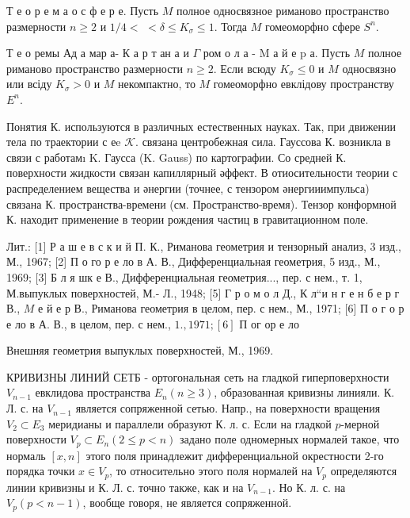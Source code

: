 \documentclass[10pt]{article}
\begin{document}
Т е о р е м а о с ф е р е. Пусть $M$ полное односвязное риманово пространство размерности $n \geqslant 2$ и $1 / 4<$ $<\delta \leqslant K_{\sigma} \leqslant 1$. Тогда $M$ гомеоморфно сфере $S^{n}$.



Т е о ремы Ад а мар а- К а р т ан а и $\Gamma$ ром о л а - $\mathrm{M}$ а й е $\mathrm{p}$ а. Пусть $M$ полное риманово пространство размерности $n \geqslant 2$. Если всюду $K_{\sigma} \leqslant 0$ и $M$ односвязно или всіду $K_{\sigma}>0$ и $M$ некомпактно, то $M$ гомеоморфно евклідову пространству $E^{n}$.



Понятия К. используются в различных естественных науках. Так, при движении тела по траектории с еe $\mathcal{K}$. связана центробежная сила. Гауссова $К$. возникла в связи с работамı K. Гаусса (K. Gauss) по картографии. Со средней К. поверхности жидкости связан капиллярный әффект. В отиосительности теории с распределением вещества и әнергии (точнее, с тензором әнергииимпульса) связана К. пространства-времени (см. Пространство-время). Тензор конформной К. находит применение в теории рождения частиц в гравитационном поле.



Лит.: [1] Р а ш е в с к и й П. К., Риманова геометрия и тензорный анализ, 3 изд., М., 1967; [2] П о го р е ло в А. В., Дифференциальная геометрия, 5 изд., М., 1969; [3] Б л я шк е В., Дифференциальная геометрия..., пер. с нем., т. 1, М.выпуклых поверхностей, М.- Л., 1948; [5] Г р о м о л Д., К л“и н г е н б е р г В., $M$ е й е р В., Риманова геометрия в целом, пер. с нем., М., 1971; [6] П о г о р е ло в А. В., в целом, пер. с нем., $1 ., 1971 ;[6]$ П ог ор е ло

Внешняя геометрия выпуклых поверхностей, М., 1969.



КРИВИЗНЫ ЛИНИЙ СЕТБ - ортогональная сеть на гладкой гиперповерхности $V_{n-1}$ евклидова пространства $E_{n}(n \geqslant 3)$, образованная кривизны линияли. К. Л. с. на $V_{n-1}$ является сопряженной сетью. Напр., на поверхности вращения $V_{2} \subset E_{3}$ меридианы и параллели образуют К. л. с. Если на гладкой $p$-мерной поверхности $V_{p} \subset E_{n}(2 \leqslant p<n)$ задано поле одномерных нормалей такое, что нормаль $[x, n]$ этого поля принадлежит дифференциальной окрестности 2-го порядка точки $x \in V_{p}$, то относительно этого поля нормалей на $V_{p}$ определяются линии кривизны и К. Л. с. точно также, как и на $V_{n-1}$. Но К. л. с. на $V_{p}(p<n-1)$, вообще говоря, не является сопряженной.
\end{document}
